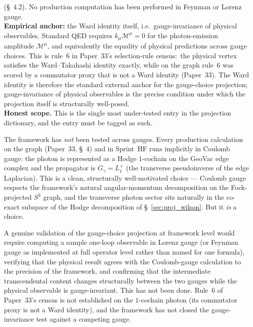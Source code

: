 \documentclass[11pt]{article}
\begin{document}
(\S~4.2).  No production computation has been performed in Feynman
or Lorenz gauge.\\
\textbf{Empirical anchor:} the Ward identity itself, i.e.\
gauge-invariance of physical observables.  Standard QED requires
$k_\mu \mathcal{M}^\mu = 0$ for the photon-emission amplitude
$\mathcal{M}^\mu$, and equivalently the equality of physical
predictions across gauge choices.  This is rule~6 in Paper~33's
selection-rule census:\ the physical vertex satisfies the
Ward--Takahashi identity exactly, while on the graph rule~6 was scored
by a commutator proxy that is not a Ward identity (Paper~33).  The
Ward identity is therefore
the standard external anchor for the gauge-choice projection;
gauge-invariance of physical observables is the precise condition
under which the projection itself is structurally well-posed.\\
\textbf{Honest scope.}  This is the single most under-tested entry in
the projection dictionary, and the entry must be tagged as such.

The framework has \emph{not} been tested across gauges.  Every
production calculation on the graph (Paper~33, \S~4) and in
Sprint~HF runs implicitly in Coulomb gauge: the photon is represented
as a Hodge $1$-cochain on the GeoVac edge complex and the propagator is
$G_\gamma = L_1^+$ (the transverse pseudoinverse of the edge
Laplacian).
This is a clean, structurally well-motivated choice ---  Coulomb gauge
respects the framework's natural angular-momentum decomposition on
the Fock-projected $S^3$ graph, and the transverse photon sector
sits naturally in the co-exact subspace of the Hodge decomposition
of \S~\ref{sec:proj_wilson}.
But it \emph{is} a choice.

A genuine validation of the gauge-choice projection at framework level
would require computing a sample one-loop observable in Lorenz gauge
(or Feynman gauge as implemented at full operator level rather than
named for one formula), verifying that the physical result agrees
with the Coulomb-gauge calculation to the precision of the framework,
and confirming that the intermediate transcendental content changes
structurally between the two gauges while the physical observable is
gauge-invariant.  This has not been done.  Rule~6 of Paper~33's census
is not established on the $1$-cochain photon (its commutator proxy is
not a Ward identity), and the framework has not closed the
gauge-invariance test against a competing gauge.
\end{document}
